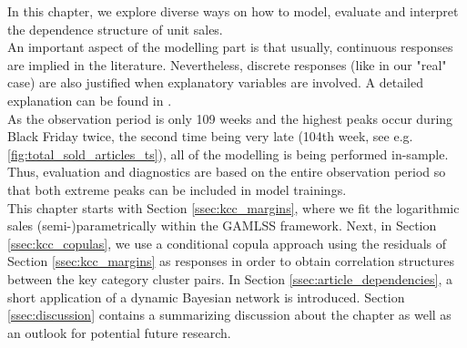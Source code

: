 
In this chapter, we explore diverse ways on how to model, evaluate and interpret the dependence structure of unit sales. 
\\





An important aspect of the modelling part is that usually, continuous responses are implied in the literature. Nevertheless, discrete responses (like in our "real" case) are also justified when explanatory variables are involved. A detailed explanation can be found in \cite{trivedi2017note}.\\ 
As the observation period is only 109 weeks and the highest peaks occur during Black Friday twice, the second time being very late (104th week, see e.g. \autoref{fig:total_sold_articles_ts}), all of the modelling is being performed in-sample. Thus, evaluation and diagnostics are based on the entire observation period so that both extreme peaks can be included in model trainings.\\
This chapter starts with Section \ref{ssec:kcc_margins}, where we fit the logarithmic sales (semi-)parametrically within the \ac{GAMLSS} framework. Next, in Section \ref{ssec:kcc_copulas}, we use a conditional copula approach using the residuals of Section \ref{ssec:kcc_margins} as responses in order to obtain correlation structures between the key category cluster pairs. In Section \ref{ssec:article_dependencies}, a short application of a dynamic Bayesian network is introduced. Section \ref{ssec:discussion} contains a summarizing discussion about the chapter as well as an outlook for potential future research.


